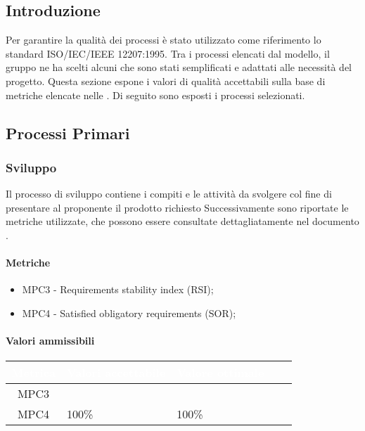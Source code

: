 
\subsection{Introduzione}
Per garantire la qualità dei processi è stato utilizzato come riferimento lo standard ISO/IEC/IEEE 12207:1995. Tra i processi elencati dal modello, il gruppo ne ha scelti alcuni che sono stati semplificati e adattati alle necessità del progetto. Questa sezione espone i valori di qualità accettabili sulla base di metriche elencate nelle . Di seguito sono esposti i processi selezionati.

\subsection{Processi Primari}
\subsubsection{Sviluppo}
Il processo di sviluppo contiene i compiti e le attività da svolgere col fine di presentare al proponente il prodotto richiesto
Successivamente sono riportate le metriche utilizzate, che possono essere consultate dettagliatamente nel documento .
\paragraph{Metriche}
\begin{itemize}
	\item MPC3 - Requirements stability index (RSI);
	\item MPC4 - Satisfied obligatory requirements (SOR);
\end{itemize}


\paragraph{Valori ammissibili}
{
\renewcommand{\arraystretch}{1.5}
\centering
\begin{longtable}{c C{2.6cm} C{3cm} C{2.6cm} C{5cm}}
\textcolor{white}{\textbf{Metrica}}&
\textcolor{white}{\textbf{Valori accettabile}}&
\textcolor{white}{\textbf{Valore ottimale}}\\	
\endhead

MPC3 &   &  \\
MPC4 & 100\% & 100\%
\end{longtable}
}



